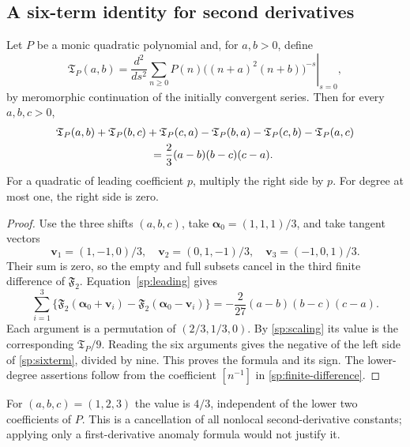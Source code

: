 \subsection{A six-term identity for second derivatives}

\begin{theorem}
\label{sp:thm:sixterm}
Let $P$ be a monic quadratic polynomial and, for $a,b>0$, define
\begin{equation}\label{sp:Tdef}
 \mathfrak T_P(a,b)=\left.\frac{d^2}{ds^2}
     \sum_{n\ge0}P(n)\bigl((n+a)^2(n+b)\bigr)^{-s}
                                      \right|_{s=0},
\end{equation}
by meromorphic continuation of the initially convergent series. Then
for every $a,b,c>0$,
\begin{align}\label{sp:sixterm}
 &\mathfrak T_P(a,b)+\mathfrak T_P(b,c)+\mathfrak T_P(c,a)
 -\mathfrak T_P(b,a)-\mathfrak T_P(c,b)-\mathfrak T_P(a,c)\notag\\
 &\hspace{30mm}=\frac23(a-b)(b-c)(c-a).
\end{align}
For a quadratic of leading coefficient $p$, multiply the right side
by $p$. For degree at most one, the right side is zero.
\end{theorem}

\begin{proof}
Use the three shifts $(a,b,c)$, take
$\boldsymbol\alpha_0=(1,1,1)/3$, and take tangent vectors
\[
 \boldsymbol v_1=(1,-1,0)/3,\quad
 \boldsymbol v_2=(0,1,-1)/3,\quad
 \boldsymbol v_3=(-1,0,1)/3.
\]
Their sum is zero, so the empty and full subsets cancel in the
third finite difference of $\mathfrak F_2$. Equation~\eqref{sp:leading}
gives
\[
 \sum_{i=1}^3\{\mathfrak F_2(\boldsymbol\alpha_0+\boldsymbol v_i)
      -\mathfrak F_2(\boldsymbol\alpha_0-\boldsymbol v_i)\}
 =-\frac2{27}(a-b)(b-c)(c-a).
\]
Each argument is a permutation of $(2/3,1/3,0)$. By
\eqref{sp:scaling} its value is the corresponding $\mathfrak T_P/9$.
Reading the six arguments gives the negative of the left side of
\eqref{sp:sixterm}, divided by nine. This proves the formula and its
sign. The lower-degree assertions follow from the coefficient
$[n^{-1}]$ in \eqref{sp:finite-difference}.
\end{proof}

For $(a,b,c)=(1,2,3)$ the value is $4/3$, independent of the lower
two coefficients of $P$. This is a cancellation of all nonlocal
second-derivative constants; applying only a first-derivative anomaly
formula would not justify it.

